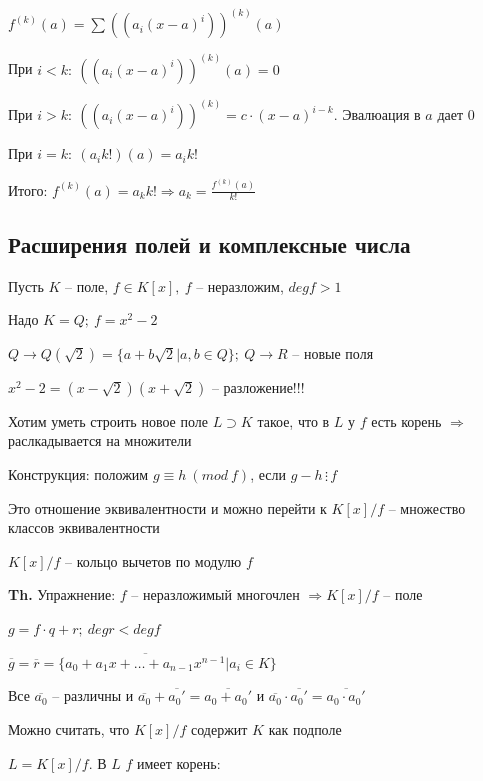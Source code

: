 \documentclass[14pt, letter paper]{article}
\begin{document}
$f^{(k)}(a) = \sum ((a_i(x - a)^i))^{(k)}(a)$

При $i < k:\ ((a_i(x - a)^i))^{(k)}(a) = 0$

При $i > k:\ ((a_i(x - a)^i))^{(k)} = c \cdot (x - a)^{i - k}$. Эвалюация в $a$ дает 0

При $i = k:\ (a_i k!)(a) = a_i k!$

Итого: $f^{(k)}(a) = a_k k! \Rightarrow a_k = \frac{f^{(k)}(a)}{k!}$

\vspace{5mm}

\begin{center}
    \section*{Расширения полей и комплексные числа}
\end{center}

Пусть $K$ -- поле, $f \in K[x],\ f$ -- неразложим, $degf > 1$

Надо $K = Q;\ f = x^2 - 2$

$Q \rightarrow Q(\sqrt{2}) = \{a + b\sqrt{2} | a, b \in Q\};\ Q \rightarrow R$ -- новые поля

$x^2 - 2 = (x - \sqrt{2})(x + \sqrt{2})$ -- разложение!!!

Хотим уметь строить новое поле $L \supset K$ такое, что в $L$ у $f$ есть корень $\Rightarrow$ раслкадывается на множители

Конструкция: положим $g \equiv h\ (mod\ f)$, если $g - h \, \vdots \, f$

Это отношение эквивалентности и можно перейти к $K[x]/f$ -- множество классов эквивалентности

$K[x]/f$ -- кольцо вычетов по модулю $f$

\textbf{Th.} Упражнение: $f$ -- неразложимый многочлен $\Rightarrow K[x]/f$ -- поле

$g = f \cdot q + r;\ degr < degf$

$\overline{g} = \overline{r} = \{\overline{a_0 + a_1x + \ldots + a_{n-1}x^{n-1}} | a_i \in K\}$

Все $\overline{a_0}$ -- различны и $\overline{a_0} + \overline{a_0'} = \overline{a_0 + a_0'}$ и $\overline{a_0} \cdot \overline{a_0'} = \overline{a_0 \cdot a_0'}$

Можно считать, что $K[x]/f$ содержит $K$ как подполе

\vspace{5mm}

$L = K[x]/f$. В $L$ $f$ имеет корень:
\end{document}
